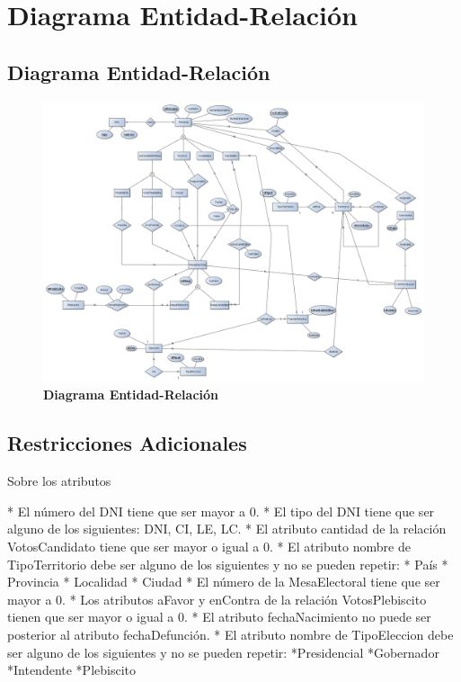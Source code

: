 \section{Diagrama Entidad-Relación}
\subsection{Diagrama Entidad-Relación}
\begin{figure}[H]
   \begin{center}
   \includegraphics[angle=90,scale=0.32]{graphics/der.png}
   \caption{\textbf{Diagrama Entidad-Relación}}
   \label{fig:der}
   \end{center}
\end{figure}

\subsection{Restricciones Adicionales}

Sobre los atributos

* El número del DNI tiene que ser mayor a 0.
* El tipo del DNI tiene que ser alguno de los siguientes: DNI, CI, LE, LC.
* El atributo cantidad de la relación VotosCandidato tiene que ser mayor o igual a 0.
* El atributo nombre de TipoTerritorio debe ser alguno de los siguientes y no se pueden repetir:
  * País
  * Provincia
  * Localidad
  * Ciudad
* El número de la MesaElectoral tiene que ser mayor a 0.
* Los  atributos aFavor y enContra de la relación VotosPlebiscito  tienen que ser mayor o igual a 0.
* El atributo fechaNacimiento no puede ser posterior al atributo fechaDefunción.
* El atributo nombre de TipoEleccion debe ser alguno de los siguientes y no se pueden repetir:
*Presidencial
*Gobernador
*Intendente
*Plebiscito

